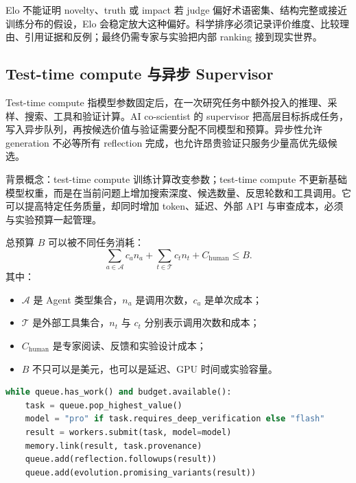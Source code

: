 \documentclass[a4paper]{article}
\begin{document}
\begin{warningbox}{Elo 不能证明 novelty、truth 或 impact}
若 judge 偏好术语密集、结构完整或接近训练分布的假设，Elo 会稳定放大这种偏好。科学排序必须记录评价维度、比较理由、引用证据和反例；最终仍需专家与实验把内部 ranking 接到现实世界。
\end{warningbox}


\subsection{Test-time compute 与异步 Supervisor}

Test-time compute 指模型参数固定后，在一次研究任务中额外投入的推理、采样、搜索、工具和验证计算。AI co-scientist 的 supervisor 把高层目标拆成任务，写入异步队列，再按候选价值与验证需要分配不同模型和预算。异步性允许 generation 不必等所有 reflection 完成，也允许昂贵验证只服务少量高优先级候选。

\begin{knowledgebox}{背景概念：test-time compute}
训练计算改变参数；test-time compute 不更新基础模型权重，而是在当前问题上增加搜索深度、候选数量、反思轮数和工具调用。它可以提高特定任务质量，却同时增加 token、延迟、外部 API 与审查成本，必须与实验预算一起管理。
\end{knowledgebox}

总预算 $B$ 可以被不同任务消耗：
$$
\sum_{a\in\mathcal{A}} c_a n_a
+\sum_{t\in\mathcal{T}} c_t n_t
+C_{\text{human}}
\le B.
$$
其中：
\begin{itemize}
  \item $\mathcal{A}$ 是 Agent 类型集合，$n_a$ 是调用次数，$c_a$ 是单次成本；
  \item $\mathcal{T}$ 是外部工具集合，$n_t$ 与 $c_t$ 分别表示调用次数和成本；
  \item $C_{\text{human}}$ 是专家阅读、反馈和实验设计成本；
  \item $B$ 不只可以是美元，也可以是延迟、GPU 时间或实验容量。
\end{itemize}

\begin{lstlisting}[language=Python,caption={异步 Supervisor 的资源路由示意}]
while queue.has_work() and budget.available():
    task = queue.pop_highest_value()
    model = "pro" if task.requires_deep_verification else "flash"
    result = workers.submit(task, model=model)
    memory.link(result, task.provenance)
    queue.add(reflection.followups(result))
    queue.add(evolution.promising_variants(result))
\end{lstlisting}
\end{document}
